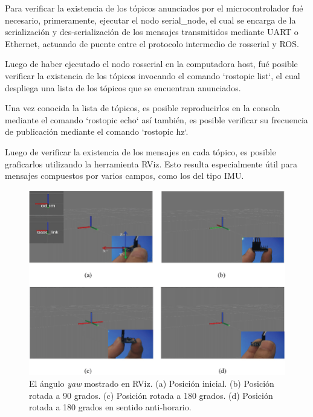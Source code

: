 Para verificar la existencia de los tópicos anunciados por el microcontrolador fué necesario, primeramente, ejecutar el nodo serial\_node, el cual se encarga de la serialización y des-serialización de los mensajes transmitidos mediante UART o Ethernet, actuando de puente entre el protocolo intermedio de rosserial y ROS.

Luego de haber ejecutado el nodo rosserial en la computadora host, fué posible verificar la existencia de los tópicos invocando el comando `rostopic list`, el cual despliega una lista de los tópicos que se encuentran anunciados.

Una vez conocida la lista de tópicos, es posible reproducirlos en la consola mediante el comando `rostopic echo` así también, es posible verificar su frecuencia de publicación mediante el comando `rostopic hz`.

Luego de verificar la existencia de los mensajes en cada tópico, es posible graficarlos utilizando la herramienta RViz. Esto resulta especialmente útil para mensajes compuestos por varios campos, como los del tipo IMU.

\begin{figure}[ht]
    \centering
    \includegraphics[scale=.4]{./Figures/imu_en_rviz.png}
    \caption{El ángulo \textit{yaw} mostrado en RViz. (a) Posición inicial. (b) Posición rotada a 90 grados. (c) Posición rotada a 180 grados. (d) Posición rotada a 180 grados en sentido anti-horario.}
    \label{fig:cuadradoAzul}
\end{figure}


